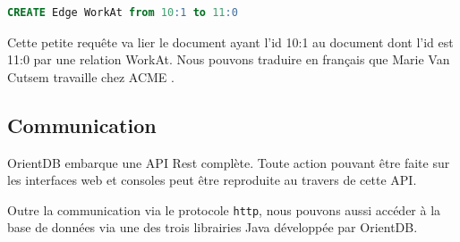 \documentclass[a4paper,fleqn,12pt,oneside]{report}
\begin{document}
\begin{lstlisting}[language=SQL]
CREATE Edge WorkAt from 10:1 to 11:0
\end{lstlisting}

Cette petite requête va lier le document ayant l'id 10:1 au document dont l'id est 11:0 par une relation WorkAt. Nous pouvons traduire en français que Marie Van Cutsem travaille chez ACME \cite{OrientDBGettingStarted}.

\subsection{Communication}

OrientDB embarque une API Rest complète\cite{fielding2000architectural}. Toute action pouvant être faite sur les interfaces web et consoles peut être reproduite au travers de cette API.

Outre la communication via le protocole \texttt{http}, nous pouvons aussi accéder à la base de données via une des trois librairies Java développée par OrientDB.
\end{document}
